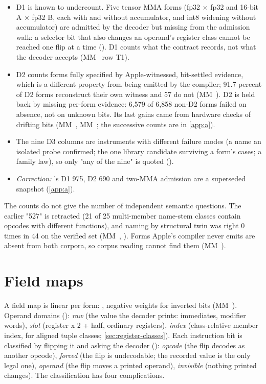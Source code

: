 \begin{itemize}
\item D1 is known to undercount. Five tensor MMA forms (fp32 × fp32 and 16-bit A × fp32 B, each with and without
  accumulator, and int8 widening without accumulator) are admitted by the decoder but missing from the admission walk:
  a selector bit that also changes an operand's register class cannot be reached one flip at a time
  (). D1 counts what the contract records, not what the decoder accepts (MM~ row T1).
\item D2 counts forms fully specified by Apple-witnessed, bit-settled evidence, which is a different property from being
  emitted by the compiler; 91.7 percent of D2 forms reconstruct their own witness and 57 do not (MM~). D2 is held back by missing per-form evidence:
  6,579 of 6,858 non-D2 forms failed on absence, not on unknown bits. Its last gains came from hardware checks of
  drifting bits (MM~, MM~; the successive counts are in \cref{app:a}).
\item The nine D3 columns are instruments with different failure modes (a name an isolated probe confirmed; the one library
  candidate surviving a form's cases; a family law), so only "any of the nine" is quoted ().
\item \emph{Correction:} 's D1 975, D2 690 and two-MMA admission are a superseded snapshot
  (\cref{app:a}).
\end{itemize}

The counts do not give the number of independent semantic questions. The earlier "527" is retracted (21 of 25
multi-member name-stem classes contain opcodes with different functions), and naming by structural twin was right 0
times in 44 on the verified set (MM~, ). Forms Apple's compiler never emits
are absent from both corpora, so corpus reading cannot find them (MM~).

\section{Field maps}\label{sec:field-maps}

A field map is linear per form: , negative
weights for inverted bits (MM~). Operand domains (): \emph{raw} (the value the decoder prints:
immediates, modifier words), \emph{slot} (register x 2 + half, ordinary registers), \emph{index} (class-relative member index, for
aligned tuple classes; \cref{sec:register-classes}). Each instruction bit is classified by flipping it and asking the decoder
(): \emph{opcode} (the flip decodes as another opcode), \emph{forced} (the flip is undecodable; the recorded
value is the only legal one), \emph{operand} (the flip moves a printed operand), \emph{invisible} (nothing printed changes).
The classification has four complications.


